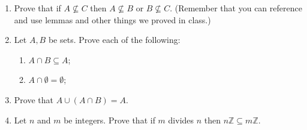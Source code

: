 \begin{enumerate}
\item Prove that if $A \not \subseteq C$ then  $A \not \subseteq B$ or $B \not \subseteq C$. (Remember that you can reference and use lemmas and other things we proved in class.)

 \item Let $A,B$ be sets. Prove each of the following:
 \begin{enumerate}
 \item $A \cap B \subseteq A$;
 \item $A \cap \emptyset = \emptyset$;
 \end{enumerate}
  
\item Prove that $A \cup (A \cap B) = A.$

\item Let $n$ and $m$ be integers. Prove that if $m$ divides $n$ then $n\mathbb{Z} \subseteq m\mathbb{Z}$.

 

\end{enumerate}

